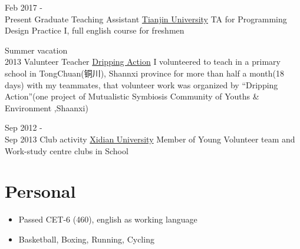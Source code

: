 \documentclass[letterpaper]{twentysecondcv} %
\begin{document}
\begin{twenty}

\twentyitem
	{Feb 2017 - \\ Present}
	{Graduate Teaching Assistant}
	{\href{http://tju.edu.cn/}{Tianjin University}}
	{}
	{TA for Programming Design Practice I, full english course for freshmen}	

\twentyitem
	{Summer vacation \\ 2013}
	{Valunteer Teacher}
	{\href{http://blog.sina.com.cn/xiaanedu}{Dripping Action}}
	{}
	{I volunteered to teach in a primary school in TongChuan(铜川), Shannxi province for more than half a month(18 days) with my teammates, that volunteer work was organized by “Dripping Action”(one project of Mutualistic Symbiosis Community of Youths \& Environment ,Shaanxi)
	}


\twentyitem
	{Sep 2012 - \\ Sep 2013}
	{Club activity}
	{\href{http://www.xidian.edu.cn/}{Xidian University}}
	{}
	{Member of Young Volunteer team and Work-study centre clubs in
School}	


	
	
\end{twenty}

\section{Personal}

\begin{twenty} %
	
\twentyitem
	{}
	{}
	{}
	{}
	{        
		{\begin{itemize}
    	    \item Passed CET-6 (460), english as working language
    	    \item Basketball, Boxing, Running, Cycling
	    \end{itemize}
     	}
	}	
        
\end{twenty}
\end{document}
